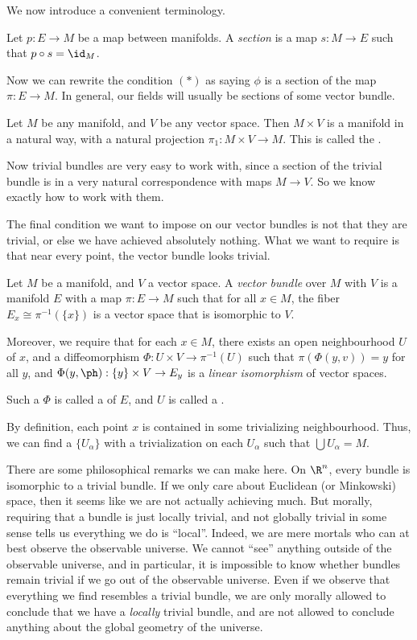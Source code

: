 \documentclass[a4paper]{article}
\begin{document}
We now introduce a convenient terminology.
\begin{defi}[Section]
  Let $p: E \to M$ be a map between manifolds. A \emph{section} is a map $s: M \to E$ such that $p \circ s = \id_M$.
\end{defi}
Now we can rewrite the condition $(*)$ as saying $\phi$ is a section of the map $\pi: E \to M$. In general, our fields will usually be sections of some vector bundle.

\begin{eg}
  Let $M$ be any manifold, and $V$ be any vector space. Then $M \times V$ is a manifold in a natural way, with a natural projection $\pi_1: M \times V \to M$. This is called the .
\end{eg}

Now trivial bundles are very easy to work with, since a section of the trivial bundle is in a very natural correspondence with maps $M \to V$. So we know exactly how to work with them.

The final condition we want to impose on our vector bundles is not that they are trivial, or else we have achieved absolutely nothing. What we want to require is that near every point, the vector bundle looks trivial.

\begin{defi}
  Let $M$ be a manifold, and $V$ a vector space. A \emph{vector bundle} over $M$ with  $V$ is a manifold $E$ with a map $\pi: E \to M$ such that for all $x \in M$, the fiber $E_x \cong \pi^{-1}(\{x\})$ is a vector space that is isomorphic to $V$.

  Moreover, we require that for each $x \in M$, there exists an open neighbourhood $U$ of $x$, and a diffeomorphism $\Phi: U \times V \to \pi^{-1}(U)$ such that $\pi(\Phi(y, v)) = y$ for all $y$, and $\Phi(y, \ph): \{y\} \times V \to E_y$ is a \emph{linear isomorphism} of vector spaces.

  Such a $\Phi$ is called a  of $E$, and $U$ is called a .
\end{defi}
By definition, each point $x$ is contained in some trivializing neighbourhood. Thus, we can find a  $\{U_\alpha\}$ with a trivialization on each $U_\alpha$ such that $\bigcup U_\alpha = M$.

There are some philosophical remarks we can make here. On $\R^n$, every bundle is isomorphic to a trivial bundle. If we only care about Euclidean (or Minkowski) space, then it seems like we are not actually achieving much. But morally, requiring that a bundle is just locally trivial, and not globally trivial in some sense tells us everything we do is ``local''. Indeed, we are mere mortals who can at best observe the observable universe. We cannot ``see'' anything outside of the observable universe, and in particular, it is impossible to know whether bundles remain trivial if we go out of the observable universe. Even if we observe that everything we find resembles a trivial bundle, we are only morally allowed to conclude that we have a \emph{locally} trivial bundle, and are not allowed to conclude anything about the global geometry of the universe.
\end{document}
